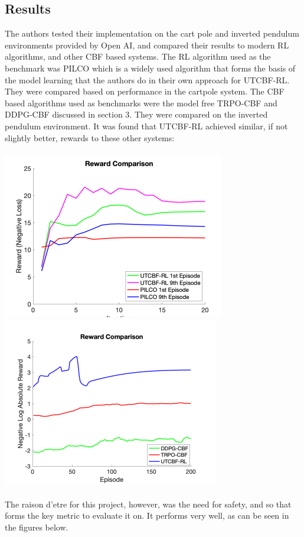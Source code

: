\documentclass{article}
\begin{document}
\subsection{Results}
The authors tested their implementation on the cart pole and inverted pendulum environments provided by Open AI, and compared their results to modern RL algorithms, and other CBF based systems. The RL algorithm used as the benchmark was PILCO \cite{deisenroth2011pilco} which is a widely used algorithm that forms the basis of the model learning that the authors do in their own approach for UTCBF-RL. They were compared based on performance in the cartpole system. The CBF based algorithms used as benchmarks were the model free TRPO-CBF and DDPG-CBF discussed in section 3. They were compared on the inverted pendulum environment. It was found that UTCBF-RL achieved similar, if not slightly better, rewards to these other systems: \\\\
\includegraphics[scale = 0.8]{RewardComparison.png}
\includegraphics[scale = 0.8]{RewardComparison-CBF.png}\\\\
The raison d'etre for this project, however, was the need for safety, and so that forms the key metric to evaluate it on. It performs very well, as can be seen in the figures below.\\
\end{document}
